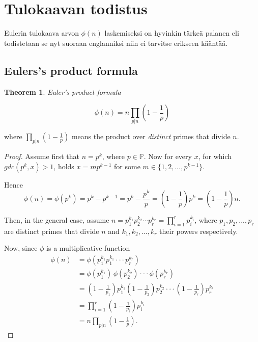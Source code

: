 \documentclass{article}
\theoremstyle{definition}
\newtheorem{theorem}[subsection]{Theorem}
\begin{document}
\section{Tulokaavan todistus}

Eulerin tulokaava arvon $\phi(n)$ laskemiseksi on hyvinkin tärkeä palanen eli todistetaan se nyt suoraan englanniksi niin ei tarvitse erikseen kääntää.

\subsection{Eulers's product formula}

\begin{theorem}{\emph{Euler's product formula}}

\begin{equation*}
    \phi(n) = n \prod_{p \vert n} \left(1 - \frac{1}{p}\right)
\end{equation*}

where $\prod_{p \vert n} (1 - \frac{1}{p})$ means the product over \emph{distinct} primes that divide $n$.

\begin{proof}

Assume first that $n = p^k$, where $p\in \mathbb{P}$. Now for every $x$, for which $gdc(p^k,x)>1$, holds $x=mp^{k-1}$ for some $m\in \{1,2,...,p^{k-1}\}$.


Hence
\begin{equation*}
    \phi(n)=\phi(p^k)=p^k-p^{k-1}=p^k-\frac{p^k}{p}=\left(1-\frac{1}{p}\right)p^k=\left(1-\frac{1}{p}\right)n.
\end{equation*}

Then, in the general case, assume $n=p_1^{k_1} p_2^{k_2} \cdots p_r^{k_r}=\prod_{i=1}^r p_i^{k_i}$, where $p_1,p_2,...,p_r$ are distinct primes that divide $n$ and $k_1,k_2,...,k_r$ their powers respectively. 


Now, since $\phi$ is a multiplicative function
\begin{align*}
    \phi(n) & = \phi(p_1^{k_1} p_1^{k_1} \cdot \cdot \cdot p_r^{k_r})\\
    & = \phi(p_1^{k_1})\,\phi(p_2^{k_2}) \cdot \cdot \cdot \phi(p_r^{k_r})\\
    & = \left(1-\frac{1}{p_1}\right)p_1^{k_1} \left(1-\frac{1}{p_2}\right)p_2^{k_2} \cdot \cdot \cdot \left(1-\frac{1}{p_r}\right)p_r^{k_r}\\
    & = \prod_{i=1}^r \left(1-\frac{1}{p_i}\right) p_i^{k_i}\\
    & = n \prod_{p \vert n} \left(1 - \frac{1}{p}\right).
\end{align*}

\end{proof}

\end{theorem}
\end{document}
